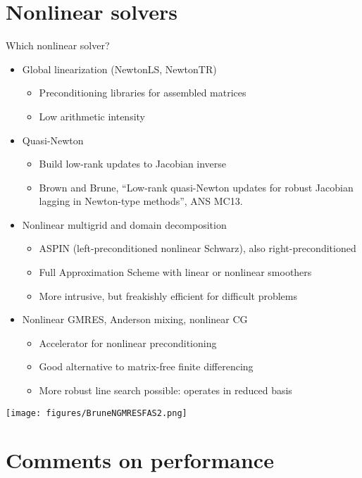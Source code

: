\documentclass{beamer}
\begin{document}
\section{Nonlinear solvers}
\begin{frame}{Which nonlinear solver?}
  \begin{itemize}
  \item Global linearization (NewtonLS, NewtonTR)
    \begin{itemize}
    \item Preconditioning libraries for assembled matrices
    \item Low arithmetic intensity
    \end{itemize}
  \item Quasi-Newton
    \begin{itemize}
    \item Build low-rank updates to Jacobian inverse
    \item Brown and Brune, ``Low-rank quasi-Newton updates for robust Jacobian lagging in Newton-type methods'', ANS MC13.
    \end{itemize}
  \item Nonlinear multigrid and domain decomposition
    \begin{itemize}
    \item ASPIN (left-preconditioned nonlinear Schwarz), also right-preconditioned
    \item Full Approximation Scheme with linear or nonlinear smoothers
    \item More intrusive, but freakishly efficient for difficult problems
    \end{itemize}
  \item Nonlinear GMRES, Anderson mixing, nonlinear CG
    \begin{itemize}
    \item Accelerator for nonlinear preconditioning
    \item Good alternative to matrix-free finite differencing
    \item More robust line search possible: operates in reduced basis
    \end{itemize}
  \end{itemize}
\end{frame}
\begin{frame}
  \texttt{[image: figures/BruneNGMRESFAS2.png]}
\end{frame}




\section{Comments on performance}




\end{document}
